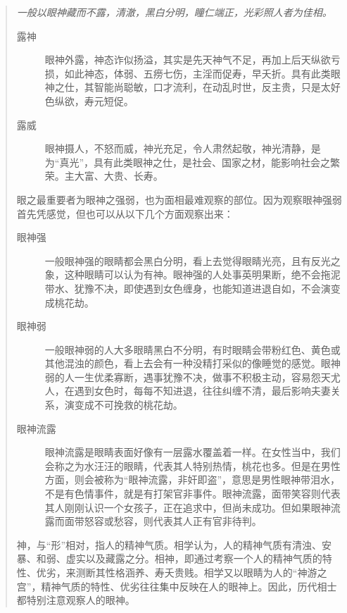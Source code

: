 \begin{quotation}\it
    一般以眼神藏而不露，清澈，黑白分明，瞳仁端正，光彩照人者为佳相。

    \begin{description}
        \item[露神] 眼神外露，神态诈似扬溢，其实是先天神气不足，再加上后天纵欲亏损，如此神态，体弱、五痨七伤，主淫而促寿，早夭折。具有此类眼神之仕，其智能尚聪敏，口才流利，在动乱时世，反主贵，只是太好色纵欲，寿元短促。
        \item[露威] 眼神摄人，不怒而威，神光充足，令人肃然起敬，神光清静，是为“真光”，具有此类眼神之仕，是社会、国家之材，能影响社会之繁荣。主大富、大贵、长寿。
    \end{description}

    眼之最重要者为眼神之强弱，也为面相最难观察的部位。因为观察眼神强弱首先凭感觉，但也可以从以下几个方面观察出来：

    \begin{description}
        \item[眼神强] 一般眼神强的眼睛都会黑白分明，看上去觉得眼睛光亮，且有反光之象，这种眼睛可以认为有神。眼神强的人处事英明果断，绝不会拖泥带水、犹豫不决，即使遇到女色缠身，也能知道进退自如，不会演变成桃花劫。
        \item[眼神弱] 一般眼神弱的人大多眼睛黑白不分明，有时眼睛会带粉红色、黄色或其他混浊的颜色，看上去会有一种没精打采似的像睡觉的感觉。眼神弱的人一生优柔寡断，遇事犹豫不决，做事不积极主动，容易怨天尤人，在遇到女色时，每每不知进退，往往纠缠不清，最后影响夫妻关系，演变成不可挽救的桃花劫。
        \item[眼神流露] 眼神流露是眼睛表面好像有一层露水覆盖着一样。在女性当中，我们会称之为水汪汪的眼睛，代表其人特别热情，桃花也多。但是在男性方面，则会被称为“眼神流露，非奸即盗”，意思是男性眼神带泪水，不是有色情事件，就是有打架官非事件。眼神流露，面带笑容则代表其人刚刚认识一个女孩子，正在追求中，但尚未成功。但如果眼神流露而面带怒容或愁容，则代表其人正有官非待判。
    \end{description}

    神，与“形”相对，指人的精神气质。相学认为，人的精神气质有清浊、安暴、和弱、虚实以及藏露之分。相神，即通过考察一个人的精神气质的特性、优劣，来测断其性格涵养、寿夭贵贱。相学又以眼睛为人的“神游之宫”，精神气质的特性、优劣往往集中反映在人的眼神上。因此，历代相士都特别注意观察人的眼神。


\end{quotation}

